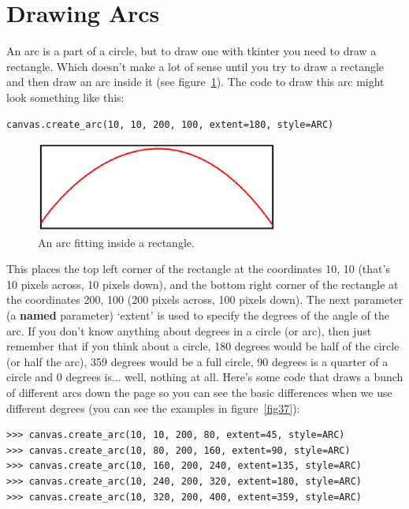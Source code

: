 \section{Drawing Arcs}

An arc is a part of a circle, but to draw one with tkinter you need to draw a rectangle. Which doesn't make a lot of sense until you try to draw a rectangle and then draw an arc inside it (see figure~\ref{fig36}). The code to draw this arc might look something like this:

\begin{listing}
\begin{verbatim}
canvas.create_arc(10, 10, 200, 100, extent=180, style=ARC)
\end{verbatim}
\end{listing}

\begin{figure}
\begin{center}
\includegraphics[width=80mm]{eps/figure36.eps}
\end{center}
\caption{An arc fitting inside a rectangle.}\label{fig36}
\end{figure}

This places the top left corner of the rectangle at the coordinates 10, 10 (that's 10 pixels across, 10 pixels down), and the bottom right corner of the rectangle at the coordinates 200, 100 (200 pixels across, 100 pixels down).  The next parameter (a \textbf{named} parameter) `extent' is used to specify the degrees of the angle of the arc.  If you don't know anything about degrees in a circle (or arc), then just remember that if you think about a circle, 180 degrees would be half of the circle (or half the arc), 359 degrees would be a full circle, 90 degrees is a quarter of a circle and 0 degrees is$\ldots$ well, nothing at all. Here's some code that draws a bunch of different arcs down the page so you can see the basic differences when we use different degrees (you can see the examples in figure~\ref{fig37}):

\begin{listing}
\begin{verbatim}
>>> canvas.create_arc(10, 10, 200, 80, extent=45, style=ARC)
>>> canvas.create_arc(10, 80, 200, 160, extent=90, style=ARC)
>>> canvas.create_arc(10, 160, 200, 240, extent=135, style=ARC)
>>> canvas.create_arc(10, 240, 200, 320, extent=180, style=ARC)
>>> canvas.create_arc(10, 320, 200, 400, extent=359, style=ARC)
\end{verbatim}
\end{listing}

